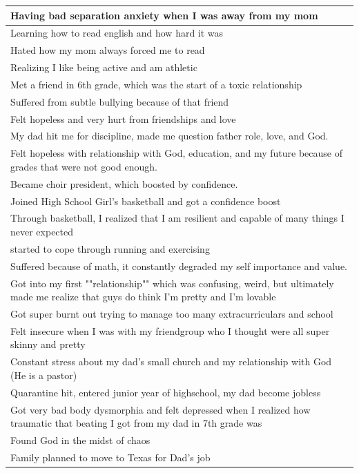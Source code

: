\documentclass[
  .7em,
  letterpaper,
  DIV=11,
  numbers=noendperiod]{scrartcl}
\begin{document}
\begin{table}
\begin{tabular}{l}
\hline
Having bad separation anxiety when I was away from my mom\\
\hline
Learning how to read english and how hard it was\\
\hline
Hated how my mom always forced me to read\\
\hline
Realizing I like being active and am athletic\\
\hline
Met a friend in 6th grade, which was the start of a toxic relationship\\
\hline
Suffered from subtle bullying because of that friend\\
\hline
Felt hopeless and very hurt from friendships and love\\
\hline
My dad hit me for discipline, made me question father role, love, and God.\\
\hline
Felt hopeless with relationship with God, education, and my future because of grades that were not good enough.\\
\hline
Became choir president, which boosted by confidence.\\
\hline
Joined High School Girl's basketball and got a confidence boost\\
\hline
Through basketball, I realized that I am resilient and capable of many things I never expected\\
\hline
started to cope through running and exercising\\
\hline
Suffered because of math, it constantly degraded my self importance and value.\\
\hline
Got into my first ""relationship"" which was confusing, weird, but ultimately made me realize that guys do think I'm pretty and I'm lovable\\
\hline
Got super burnt out trying to manage too many extracurriculars and school\\
\hline
Felt insecure when I was with my friendgroup who I thought were all super skinny and pretty\\
\hline
Constant stress about my dad's small church and my relationship with God (He is a pastor)\\
\hline
Quarantine hit, entered junior year of highschool,  my dad become jobless\\
\hline
Got very bad body dysmorphia and felt depressed when I realized how traumatic that beating I got from my dad in 7th grade was\\
\hline
Found God in the midst of chaos\\
\hline
Family planned to move to Texas for Dad's job\\

\end{tabular}
\end{table}
\end{document}
